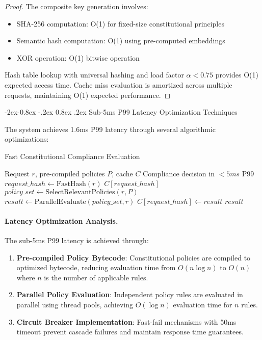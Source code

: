 \documentclass[manuscript,screen,9pt]{acmart}
\makeatletter
\renewcommand\subsubsection{\@startsection{subsubsection}{3}{\z@}%
  {-2ex\@plus -0.8ex \@minus -.2ex}%
  {0.8ex \@plus .2ex}%
  {\normalfont\normalsize\bfseries}}
\makeatother
\begin{document}
\begin{proof}
The composite key generation involves:
\begin{itemize}
    \item SHA-256 computation: O(1) for fixed-size constitutional principles
    \item Semantic hash computation: O(1) using pre-computed embeddings
    \item XOR operation: O(1) bitwise operation
\end{itemize}
Hash table lookup with universal hashing and load factor $\alpha < 0.75$ provides O(1) expected access time. Cache miss evaluation is amortized across multiple requests, maintaining O(1) expected performance.
\end{proof}

\subsubsection{Sub-5ms P99 Latency Optimization Techniques}

The system achieves 1.6ms P99 latency through several algorithmic optimizations:

\begin{algorithm}[H]
\caption{Fast Constitutional Compliance Evaluation}
\label{alg:fast_compliance}
\begin{algorithmic}[1]
\Require Request $r$, pre-compiled policies $P$, cache $C$
\Ensure Compliance decision in $< 5ms$ P99
\State $request\_hash \leftarrow \text{FastHash}(r)$
    \State \Return $C[request\_hash]$ 
\EndIf
\State $policy\_set \leftarrow \text{SelectRelevantPolicies}(r, P)$
\State $result \leftarrow \text{ParallelEvaluate}(policy\_set, r)$
\State $C[request\_hash] \leftarrow result$
\State \Return $result$
\end{algorithmic}
\end{algorithm}

\paragraph{Latency Optimization Analysis.} The sub-5ms P99 latency is achieved through:

\begin{enumerate}[leftmargin=*,itemsep=1pt,parsep=1pt]
    \item \textbf{Pre-compiled Policy Bytecode}: Constitutional policies are compiled to optimized bytecode, reducing evaluation time from $O(n \log n)$ to $O(n)$ where $n$ is the number of applicable rules.
    \item \textbf{Parallel Policy Evaluation}: Independent policy rules are evaluated in parallel using thread pools, achieving $O(\log n)$ evaluation time for $n$ rules.
    \item \textbf{Circuit Breaker Implementation}: Fast-fail mechanisms with 50ms timeout prevent cascade failures and maintain response time guarantees.
\end{enumerate}
\end{document}
